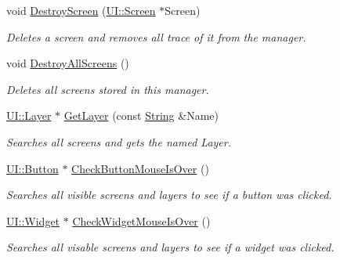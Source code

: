 \begin{DoxyCompactItemize}
void \hyperlink{classphys_1_1UIManager_a6c44c94905d7a01eb004efda66b53af8}{DestroyScreen} (\hyperlink{classphys_1_1UI_1_1Screen}{UI::Screen} $\ast$Screen)
\begin{DoxyCompactList}\small\item\em Deletes a screen and removes all trace of it from the manager. \item\end{DoxyCompactList}\item 
\hypertarget{classphys_1_1UIManager_a97555e02aad6c85cac6bf67fbe074cd1}{
void \hyperlink{classphys_1_1UIManager_a97555e02aad6c85cac6bf67fbe074cd1}{DestroyAllScreens} ()}
\label{d5/dc5/classphys_1_1UIManager_a97555e02aad6c85cac6bf67fbe074cd1}

\begin{DoxyCompactList}\small\item\em Deletes all screens stored in this manager. \item\end{DoxyCompactList}\item 
\hyperlink{classphys_1_1UI_1_1Layer}{UI::Layer} $\ast$ \hyperlink{classphys_1_1UIManager_ab51c45a1ac2cbc6a4f1d826d1407ed65}{GetLayer} (const \hyperlink{namespacephys_aa03900411993de7fbfec4789bc1d392e}{String} \&Name)
\begin{DoxyCompactList}\small\item\em Searches all screens and gets the named Layer. \item\end{DoxyCompactList}\item 
\hyperlink{classphys_1_1UI_1_1Button}{UI::Button} $\ast$ \hyperlink{classphys_1_1UIManager_aa1022fcbe8e1efc7a383b2eff834a152}{CheckButtonMouseIsOver} ()
\begin{DoxyCompactList}\small\item\em Searches all visible screens and layers to see if a button was clicked. \item\end{DoxyCompactList}\item 
\hyperlink{classphys_1_1UI_1_1Widget}{UI::Widget} $\ast$ \hyperlink{classphys_1_1UIManager_ab9840b483409d3453a67931b4d858d1b}{CheckWidgetMouseIsOver} ()
\begin{DoxyCompactList}\small\item\em Searches all visable screens and layers to see if a widget was clicked. \item\end{DoxyCompactList}\item 

\end{DoxyCompactItemize}
